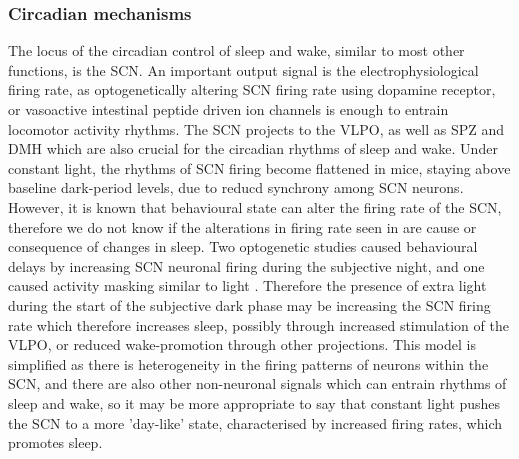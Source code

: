 \subsubsection{Circadian mechanisms}
The locus of the circadian control of sleep and wake,
similar to most other functions, is the SCN\cite{ralph_transplanted_1990, 
scammell_neural_2017, mistlberger_circadian_2005}.
An important output signal is the electrophysiological firing rate, as
optogenetically altering SCN firing rate using 
dopamine receptor\cite{jones_manipulating_2015}, or 
vasoactive intestinal peptide\cite{mazuski_entrainment_2018} 
driven ion channels is enough to entrain locomotor activity
rhythms. 
The SCN projects to the VLPO, as well as SPZ and DMH which
are also crucial for the circadian rhythms of sleep and 
wake\cite{watts_efferent_1987, sollars_neurobiology_2015, 
lu_contrasting_2001, chou_critical_2003}. 
Under constant light, the rhythms of SCN firing become 
flattened in mice\cite{coomans_detrimental_2013}, staying 
above baseline dark-period levels, 
due to reducd synchrony among SCN neurons\cite{hughes_constant_2015,
ohta_constant_2005}.
However, it is known that behavioural state can alter 
the firing rate of the SCN\cite{deboer_sleep_2003}, 
therefore we do not know if the alterations in firing rate seen 
in\cite{coomans_detrimental_2013} are cause or 
consequence of changes in sleep.
Two optogenetic studies caused behavioural delays by increasing
SCN neuronal firing during the subjective 
night, and one caused activity masking similar to light
\cite{jones_manipulating_2015, mazuski_entrainment_2018}.
Therefore the presence of extra light during the start 
of the subjective dark phase may be increasing the SCN firing 
rate which therefore increases sleep, possibly through 
increased stimulation of the VLPO, or reduced wake-promotion
through other projections. 
This model is simplified as there is heterogeneity in the 
firing patterns of neurons within the SCN\cite{mazuski_entrainment_2018},
and there are also other non-neuronal signals which can
entrain rhythms of sleep and wake\cite{silver_diffusible_1996}, 
so it may be more appropriate to say that constant light 
pushes the SCN to a more 'day-like' state, characterised by 
increased firing rates, which promotes sleep. 

